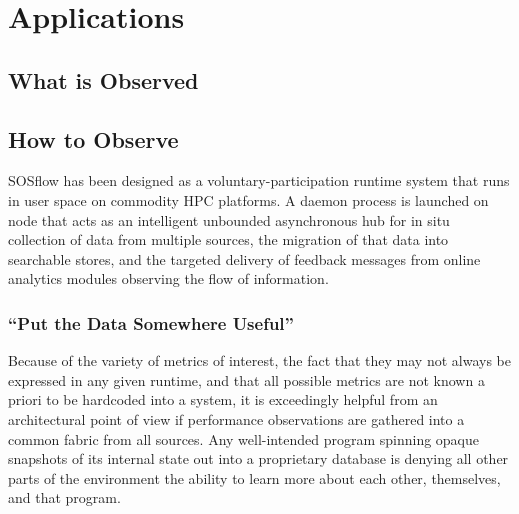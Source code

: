 
\section{Applications}



\subsection{What is Observed}


\subsection{How to Observe}

SOSflow has been designed as a voluntary-participation runtime system
that runs in user space on commodity HPC platforms.
%
A daemon process is launched on node that acts as an intelligent
unbounded asynchronous hub for in situ collection of data from
multiple sources, the migration of that data into searchable stores,
and the targeted delivery of feedback messages from online analytics
modules observing the flow of information.

\subsubsection{``Put the Data Somewhere Useful''}
Because of the variety of metrics of interest, the fact that they may
not always be expressed in any given runtime, and that all possible
metrics are not known a priori to be hardcoded into a system, it is
exceedingly helpful from an architectural point of view if performance
observations are gathered into a common fabric from all sources.
%
Any well-intended program spinning opaque snapshots of its internal
state out into a proprietary database is denying all other parts of
the environment the ability to learn more about each other,
themselves, and that program.


